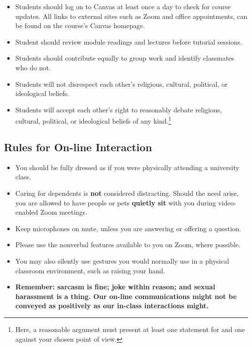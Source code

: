 \documentclass[10pt,]{article}
\providecommand{\tightlist}{%
  \setlength{\itemsep}{0pt}\setlength{\parskip}{0pt}}
\begin{document}
\begin{itemize}
\tightlist
\item
  Students should log on to Canvas at least once a day to check for
  course updates. All links to external sites such as Zoom and office
  appointments, can be found on the course's Canvas homepage.
\item
  Student should review module readings and lectures before tutorial
  sessions.
\item
  Students should contribute equally to group work and identify
  classmates who do not.
\item
  Students will not disrespect each other's religious, cultural,
  political, or ideological beliefs.
\item
  Students will accept each other's right to reasonably debate
  religious, cultural, political, or ideological beliefs of any
  kind.\footnote{Here, a reasonable argument must present at least one
    statement for and one against your chosen point of view.}
\end{itemize}

\hypertarget{rules-for-on-line-interaction}{%
\subsection{Rules for On-line
Interaction}\label{rules-for-on-line-interaction}}

\begin{itemize}
\tightlist
\item
  You should be fully dressed as if you were physically attending a
  university class.
\item
  Caring for dependents is \textbf{not} considered distracting. Should
  the need arise, you are allowed to have people or pets \textbf{quietly
  sit} with you during video-enabled Zoom meetings.
\item
  Keep microphones on mute, unless you are answering or offering a
  question.
\item
  Please use the nonverbal features available to you on Zoom, where
  possible.
\item
  You may also silently use gestures you would normally use in a
  physical classroom environment, such as raising your hand.
\item
  \textbf{Remember: sarcasm is fine; joke within reason; and sexual
  harassment is a thing. Our on-line communications might not be
  conveyed as positively as our in-class interactions might.}
\end{itemize}
\end{document}

